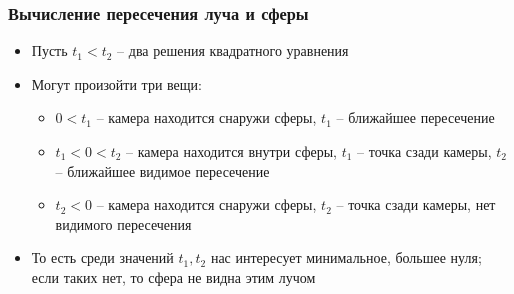 \documentclass[10pt,handout]{beamer}
\begin{document}
\begin{frame}
\frametitle{Вычисление пересечения луча и сферы}
\begin{itemize}
\item Пусть \begin{math}t_1 < t_2\end{math} -- два решения квадратного уравнения
\pause
\item Могут произойти три вещи:
\pause
\begin{itemize}
\item \begin{math}0 < t_1\end{math} -- камера находится снаружи сферы, \begin{math}t_1\end{math} -- ближайшее пересечение
\pause
\item \begin{math}t_1 < 0 < t_2\end{math} -- камера находится внутри сферы, \begin{math}t_1\end{math} -- точка сзади камеры, \begin{math}t_2\end{math} -- ближайшее видимое пересечение
\pause
\item \begin{math}t_2 < 0\end{math} -- камера находится снаружи сферы, \begin{math}t_2\end{math} -- точка сзади камеры, нет видимого пересечения
\end{itemize}
\pause
\item То есть среди значений \begin{math}t_1, t_2\end{math} нас интересует минимальное, большее нуля; если таких нет, то сфера не видна этим лучом
\end{itemize}
\end{frame}
\end{document}
